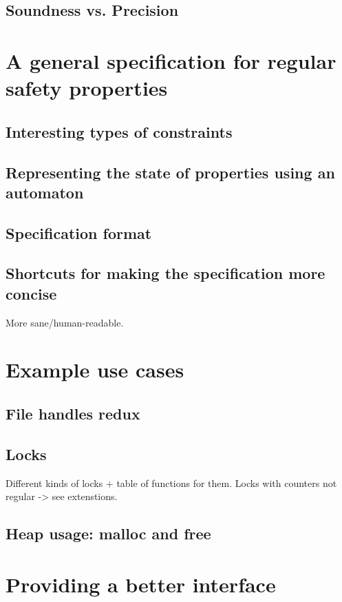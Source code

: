 \documentclass[
fontsize=11pt,paper=a4,
bibliography=totoc, listof=totoc,
headsepline,footsepline,
footinclude=false,BCOR=12mm,DIV=13]{scrbook}
\begin{document}
\section{Soundness vs. Precision}


\chapter{A general specification for regular safety properties}
\section{Interesting types of constraints}

\section{Representing the state of properties using an automaton}

\section{Specification format}

\section{Shortcuts for making the specification more concise}
More sane/human-readable.


\chapter{Example use cases}
\section{File handles redux}

\section{Locks}
Different kinds of locks + table of functions for them.
Locks with counters not regular -> see extenstions.

\section{Heap usage: malloc and free}


\chapter{Providing a better interface}
\end{document}
